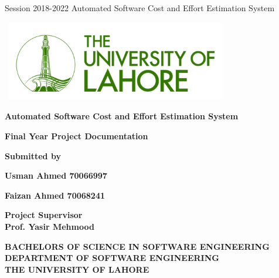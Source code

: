 \documentclass{article}
\begin{document}
\begin{center}

	Session 2018-2022
	\hfill
	Automated Software Cost and Effort Estimation System

	\vspace{10mm}

	\includegraphics[height=3.5cm, width=10cm]{logo} \\

	\vspace{10mm}

	\Huge{\textbf{Automated Software Cost and Effort Estimation System}} \\

	\vspace{10mm}

	\Huge{\textbf{Final Year Project Documentation}} \\

	\vspace{20mm}

	\Large{\textbf{Submitted by}} \\

	\vspace{15mm}

	\Large{\textbf{Usman Ahmed \hspace{3cm} 70066997}}

	\vspace{1mm}

	\Large{\textbf{Faizan Ahmed \hspace{3cm} 70068241}}

	\vspace{10mm}

	\Large{\textbf{Project Supervisor}} \\
	\vspace{3mm}
	\Large{\textbf{Prof. Yasir Mehmood}}

	\vspace{15mm}


	\Large{\textbf{BACHELORS OF SCIENCE IN SOFTWARE ENGINEERING}} \\
	\vspace{10mm}
	\Large{\textbf{DEPARTMENT OF SOFTWARE ENGINEERING}} \\
	\vspace{3mm}
	\Large{\textbf{THE UNIVERSITY OF LAHORE}} \\






\end{center}
\end{document}
